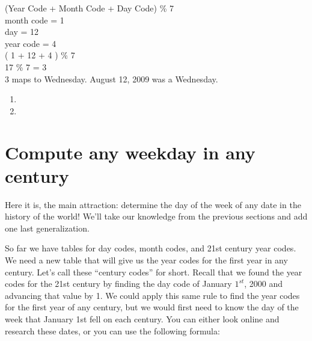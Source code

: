 \documentclass{article}
\begin{document}
  \begin{center}
    (Year Code + Month Code + Day Code) \% 7 \\
    month code = 1\\
    day = 12\\
    year code = 4\\
    ( 1 + 12 + 4 ) \% 7\\
    17 \% 7 = 3\\
    3 maps to Wednesday. August 12, 2009 was a Wednesday.\\
  \end{center}

  \begin{enumerate} \item[] \item[] \end{enumerate}

  \begin{center}
  \end{center}

\newpage

  \section{Compute any weekday in any century}
  Here it is, the main attraction: determine the day of the week of 
  any date in the history of the world! 
  We'll take our knowledge from the previous sections and add one last generalization.

  So far we have tables for day codes, month codes, and 21st century year codes. 
  We need a new table that will give us the year codes for the first year in any century. 
  Let's call these “century codes” for short.
  Recall that we found the year codes for the 21st century by 
  finding the day code of January $1^{st}$, 2000 and advancing that value by 1. 
  We could apply this same rule to find the year codes for the first year of any century, 
  but we would first need to know the day of the week that January 1st fell on each century. 
  You can either look online and research these dates, or you can use the following formula:
\end{document}
